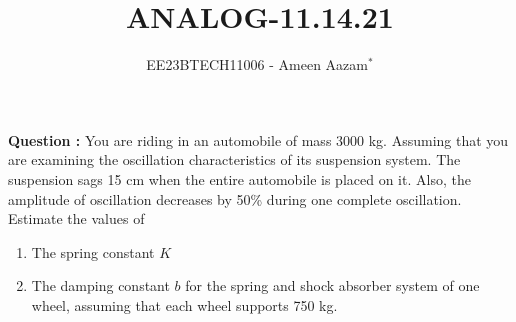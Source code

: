 \documentclass[journal,12pt,twocolumn]{IEEEtran}
\theoremstyle{remark}
\begin{document}

\vspace{3cm}

\title{ANALOG-11.14.21}
\author{EE23BTECH11006 - Ameen Aazam$^{*}$%
}
\maketitle
\newpage
\bigskip

\renewcommand{\thefigure}{\theenumi}
\renewcommand{\thetable}{\theenumi}


\vspace{3cm}
\textbf{Question :}
You are riding in an automobile of mass 3000 kg. Assuming that you are examining the oscillation characteristics of its suspension system. The suspension sags 15 cm when the entire automobile is placed on it. Also, the amplitude of oscillation decreases by 50\% during one complete oscillation. Estimate the values of
\begin{enumerate}[label=(\alph*)]
    \item The spring constant \( K \)
    \item The damping constant \( b \) for the spring and shock absorber system of one wheel, assuming that each wheel supports 750 kg.
\end{enumerate}
\end{document}
